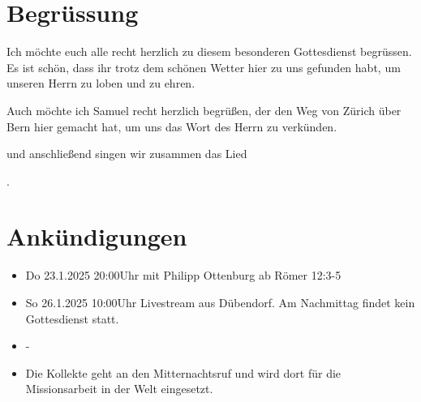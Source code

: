 
\section{Begrüssung}

Ich möchte euch alle recht herzlich zu diesem besonderen Gottesdienst begrüssen. Es ist schön, dass ihr trotz dem schönen Wetter hier zu uns gefunden habt, um unseren Herrn zu loben und zu ehren.

Auch möchte ich Samuel recht herzlich begrüßen, der den Weg von Zürich über Bern hier gemacht hat, um uns das Wort des Herrn zu verkünden. 

\noindent
\beten{} und anschließend singen wir zusammen das Lied

\noindent
{}.

\section{Ankündigungen}
\begin{itemize}
    \item {} Do 23.1.2025 20:00Uhr mit Philipp Ottenburg ab Römer 12:3-5
    \item {} So 26.1.2025 10:00Uhr Livestream aus Dübendorf. Am Nachmittag findet kein Gottesdienst statt.
    \item {} -
    \item {} Die Kollekte geht an den Mitternachtsruf und wird dort für die Missionsarbeit in der Welt eingesetzt.
\end{itemize}


